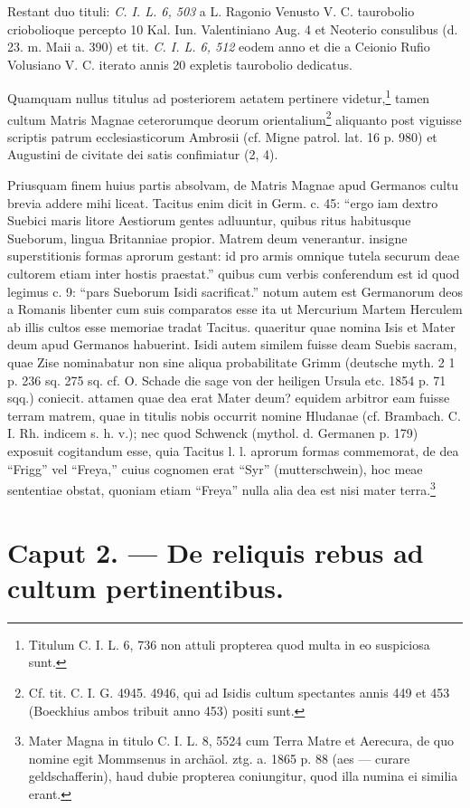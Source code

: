 \documentclass[a4paper, 11pt, oneside, polutonikogreek, german]{article}
\begin{document}
Restant duo tituli: \emph{C. I. L. 6, 503} a L. Ragonio Venusto V. C. taurobolio criobolioque percepto 10 Kal. Iun. Valentiniano Aug. 4 et Neoterio consulibus (d. 23. m. Maii a. 390) et tit. \emph{C. I. L. 6, 512} eodem anno et die a Ceionio Rufio Volusiano V. C. iterato annis 20 expletis taurobolio dedicatus.

Quamquam nullus titulus ad posteriorem aetatem pertinere videtur,\footnote{Titulum C. I. L. 6, 736 non attuli propterea quod multa in eo suspiciosa sunt.} tamen cultum Matris Magnae ceterorumque deorum orientalium\footnote{Cf. tit. C. I. G. 4945. 4946, qui ad Isidis cultum spectantes annis 449 et 453 (Boeckhius ambos tribuit anno 453) positi sunt.} aliquanto post viguisse scriptis patrum ecclesiasticorum Ambrosii (cf. Migne patrol. lat. 16 p. 980) et Augustini de civitate dei satis confimiatur (2, 4).

Priusquam finem huius partis absolvam, de Matris Magnae apud Germanos cultu brevia addere mihi liceat. Tacitus enim dicit in Germ. c. 45: "`ergo iam dextro Suebici maris litore Aestiorum gentes adluuntur, quibus ritus habitusque Sueborum, lingua Britanniae propior. Matrem deum venerantur. insigne superstitionis formas aprorum gestant: id pro armis omnique tutela securum deae cultorem etiam inter hostis praestat."' quibus cum verbis conferendum est id quod legimus c. 9: "`pars Sueborum Isidi sacrificat."' notum autem est Germanorum deos a Romanis libenter cum suis comparatos esse ita ut Mercurium Martem Herculem ab illis cultos esse memoriae tradat Tacitus. quaeritur quae nomina Isis et Mater deum apud Germanos habuerint. Isidi autem similem fuisse deam Suebis sacram, quae Zise nominabatur non sine aliqua probabilitate Grimm (deutsche myth. 2 1 p. 236 sq. 275 sq. cf. O. Schade die sage von der heiligen Ursula etc. 1854 p. 71 sqq.) coniecit. attamen quae dea erat Mater deum? equidem arbitror eam fuisse terram matrem, quae in titulis nobis occurrit nomine Hludanae (cf. Brambach. C. I. Rh. indicem s. h. v.); nec quod Schwenck (mythol. d. Germanen p. 179) exposuit cogitandum esse, quia Tacitus l. l. aprorum formas commemorat, de dea "`Frigg"' vel "`Freya,"' cuius cognomen erat "`Syr"' (mutterschwein), hoc meae sententiae obstat, quoniam etiam "`Freya"' nulla alia dea est nisi mater terra.\footnote{Mater Magna in titulo C. I. L. 8, 5524 cum Terra Matre et Aerecura, de quo nomine egit Mommsenus in archäol. ztg. a. 1865 p. 88 (aes --- curare geldschafferin), haud dubie propterea coniungitur, quod illa numina ei similia erant.}
\clearpage
\section{Caput 2. --- De reliquis rebus ad cultum pertinentibus.}
\end{document}
